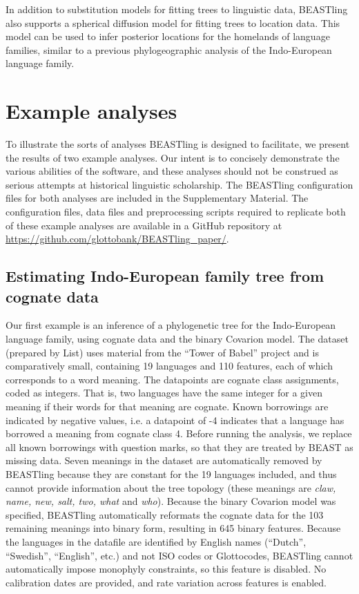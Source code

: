 \documentclass[10pt,a4paper]{article}
\begin{document}
In addition to substitution models for fitting trees to linguistic data, BEASTling also supports a spherical diffusion model\cite{Bouckaert2016} for fitting trees to location data.  This model can be used to infer posterior locations for the homelands of language families, similar to a previous phylogeographic analysis of the Indo-European language family\cite{Bouckaert2012}.

\section{Example analyses}

To illustrate the sorts of analyses BEASTling is designed to facilitate, we present the results of two example analyses.  Our intent is to concisely demonstrate the various abilities of the software, and these analyses should not be construed as serious attempts at historical linguistic scholarship.  The BEASTling configuration files for both analyses are included in the Supplementary Material.  The configuration files, data files and preprocessing scripts required to replicate both of these example analyses are available in a GitHub repository at \url{https://github.com/glottobank/BEASTling_paper/}.

\subsection{Estimating Indo-European family tree from cognate data}

Our first example is an inference of a phylogenetic tree for the Indo-European language family, using cognate data and the binary Covarion model.  The dataset\cite{List2014a} (prepared by List\cite{List2014}) uses material from the ``Tower of Babel'' project\cite{Starostin2008} and is comparatively small, containing 19 languages and 110 features, each of which corresponds to a word meaning.  The datapoints are cognate class assignments, coded as integers.  That is, two languages have the same integer for a given meaning if their words for that meaning are cognate.  Known borrowings are indicated by negative values, i.e. a datapoint of -4 indicates that a language has borrowed a meaning from cognate class 4.  Before running the analysis, we replace all known borrowings with question marks, so that they are treated by BEAST as missing data.  Seven meanings in the dataset are automatically removed by BEASTling because they are constant for the 19 languages included, and thus cannot provide information about the tree topology (these meanings are \emph{claw, name, new, salt, two, what} and \emph{who}).  Because the binary Covarion model was specified, BEASTling automatically reformats the cognate data for the 103 remaining meanings into binary form, resulting in 645 binary features.  Because the languages in the datafile are identified by English names (``Dutch'', ``Swedish'', ``English'', etc.) and not ISO codes or Glottocodes, BEASTling cannot automatically impose monophyly constraints, so this feature is disabled.  No calibration dates are provided, and rate variation across features is enabled.
\end{document}
